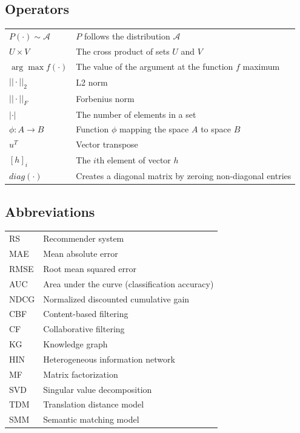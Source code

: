 \documentclass[english, 12pt, a4paper, sci, utf8, a-2b, online]{aaltothesis}
\begin{document}
\subsection*{Operators}

\begin{tabular}{ll}
$P(\cdot) \sim \mathcal{A}$ & $P$ follows the distribution $\mathcal{A}$ \\
$U\times V$                 & The cross product of sets $U$ and $V$ \\
$\arg \max f(\cdot)$        & The value of the argument at the function $f$ maximum \\
$||\cdot||_2$               & L2 norm \\
$||\cdot||_F$               & Forbenius norm \\
$|\cdot|$                   & The number of elements in a set \\
$\phi: A \rightarrow B$     & Function $\phi$ mapping the space $A$ to space $B$ \\
$u^T$                       & Vector transpose \\
$[h]_i$                     & The $i$th element of vector $h$ \\
$diag(\cdot)$               & Creates a diagonal matrix by zeroing non-diagonal entries \\
\end{tabular}

\subsection*{Abbreviations}

\begin{tabular}{ll}
RS          & Recommender system \\
MAE         & Mean absolute error \\
RMSE        & Root mean squared error \\
AUC         & Area under the curve (classification accuracy) \\
NDCG        & Normalized discounted cumulative gain \\
CBF         & Content-based filtering \\
CF          & Collaborative filtering \\
KG          & Knowledge graph \\
HIN         & Heterogeneous information network \\
MF          & Matrix factorization \\
SVD         & Singular value decomposition \\
TDM         & Translation distance model \\
SMM         & Semantic matching model \\
\end{tabular}
\end{document}
